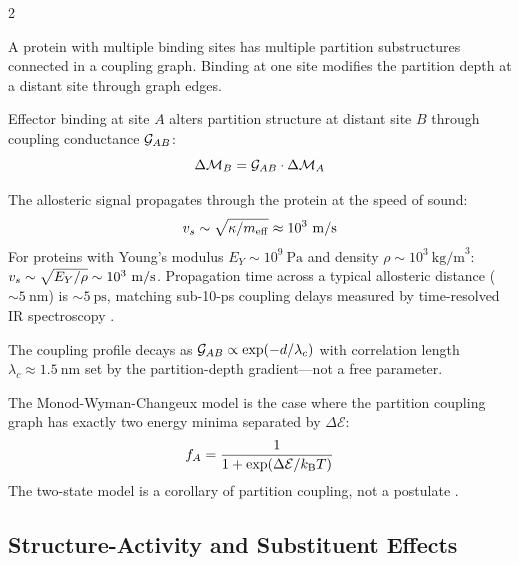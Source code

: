 \begin{multicols}{2}

A protein with multiple binding sites has multiple partition substructures connected in a coupling graph. Binding at one site modifies the partition depth at a distant site through graph edges.

\begin{theorem}
\label{thm:ch12_allostery}
Effector binding at site $A$ alters partition structure at distant site $B$ through coupling conductance $\mathcal{G}_{AB}$:
\begin{equation}
\Delta\mathcal{M}_B = \mathcal{G}_{AB}\cdot\Delta\mathcal{M}_A
\label{eq:ch12_allostery}
\end{equation}
\end{theorem}

The allosteric signal propagates through the protein at the speed of sound:
\begin{equation}
v_s \sim \sqrt{\kappa/m_{\mathrm{eff}}} \approx 10^3\ \mathrm{m/s}
\label{eq:ch12_vs}
\end{equation}
For proteins with Young's modulus $E_Y \sim 10^9\ \mathrm{Pa}$ and density $\rho \sim 10^3\ \mathrm{kg/m}^3$: $\vs \sim \sqrt{E_Y/\rho} \sim 10^3\ \mathrm{m/s}$. Propagation time across a typical allosteric distance ($\sim 5\ \mathrm{nm}$) is $\sim 5\ \mathrm{ps}$, matching sub-10-ps coupling delays measured by time-resolved IR spectroscopy \citep{hamm_zanni_2011,leitner_2008}.

The coupling profile decays as $\mathcal{G}_{AB} \propto \exp(-d/\lambda_c)$ with correlation length $\lambda_c \approx 1.5\ \mathrm{nm}$ set by the partition-depth gradient---not a free parameter.

\begin{corollary}
The Monod-Wyman-Changeux model is the case where the partition coupling graph has exactly two energy minima separated by $\Delta\mathcal{E}$:
\begin{equation}
f_A = \frac{1}{1 + \exp(\Delta\mathcal{E}/k_{\mathrm{B}} T)}
\label{eq:ch12_mwc}
\end{equation}
The two-state model is a corollary of partition coupling, not a postulate \citep{mwc_1965}.
\end{corollary}

\subsection{Structure-Activity and Substituent Effects}


\end{multicols}
